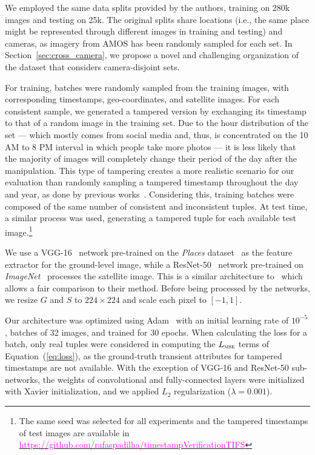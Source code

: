 \documentclass[journal]{IEEEtran}
\newcommand{\repoLink}[1]{\textcolor{magenta}{#1}}
\begin{document}
        
        We employed the same data splits provided by the authors, training on 280k images and testing on 25k. The original splits share locations (i.e., the same place might be represented through different images in training and testing) and cameras, as imagery from AMOS has been randomly sampled for each set. In Section~\ref{sec:cross_camera}, we propose a novel and challenging organization of the dataset that considers camera-disjoint sets.
        
        For training, batches were randomly sampled from the training images, with corresponding timestamps, geo-coordinates, and satellite images. For each consistent sample, we generated a tampered version by exchanging its timestamp to that of a random image in the training set. Due to the hour distribution of the set --- which mostly comes from social media and, thus, is concentrated on the 10 AM to 8 PM interval in which people take more photos --- it is less likely that the majority of images will completely change their period of the day after the manipulation. This type of tampering creates a more realistic scenario for our evaluation than randomly sampling a tampered timestamp throughout the day and year, as done by previous works~\cite{li2017you}. Considering this, training batches were composed of the same number of consistent and inconsistent tuples. At test time, a similar process was used, generating a tampered tuple for each available test image.\footnote{The same seed was selected for all experiments and the tampered timestamps of test images are available in \href{https://github.com/rafaspadilha/timestampVerificationTIFS}{\repoLink{https://github.com/rafaspadilha/timestampVerificationTIFS}}}
        
        We use a VGG-16~\cite{simonyan2014very} network pre-trained on the \emph{Places} dataset~\cite{zhou2017places} as the feature extractor for the ground-level image, while a ResNet-50~\cite{he2016identity} network pre-trained on \emph{ImageNet}~\cite{deng2009imagenet} processes the satellite image. This is a similar architecture to~\cite{salem2020learning} which allows a fair comparison to their method. Before being processed by the networks, we resize $G$ and $S$ to $224\times224$ and scale each pixel to $[-1, 1]$.
        
        Our architecture was optimized using Adam~\cite{kingma2014adam} with an initial learning rate of $10^{-5}$, batches of 32 images, and trained for 30 epochs. When calculating the loss for a batch, only real tuples were considered in computing the $L_{\textsc{mse}}$ terms of Equation~(\ref{eq:loss}), as the ground-truth transient attributes for tampered timestamps are not available. With the exception of VGG-16 and ResNet-50 sub-networks, the weights of convolutional and fully-connected layers were initialized with Xavier initialization, and we applied $L_2$ regularization ($\lambda = 0.001$).
     
\end{document}
